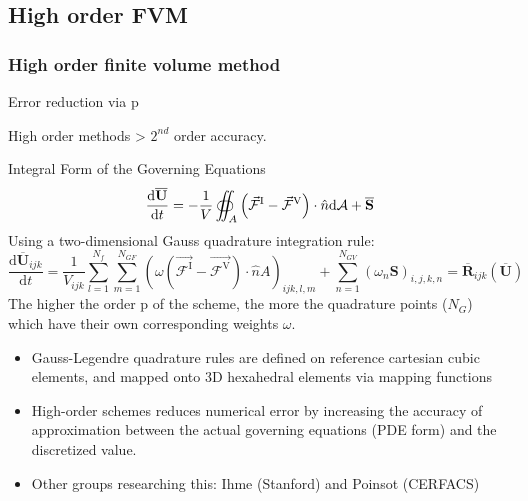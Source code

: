 \documentclass{beamer}
\begin{document}
\subsection{High order FVM}
\begin{frame}%
\frametitle{High order finite volume method}
\begin{minipage}[t][1\textheight]{1\textwidth}
\vspace{-20pt}
\begin{exampleblock}{Error reduction via p}
\tiny

High order methods > $2^{nd}$ order accuracy.

\begin{block}{Integral Form of the Governing Equations}
     \[
      \frac{\mathrm{d}\overline{\mathbf{U}}}{\mathrm{d}t} = 
      - \frac{1}{V} \oiint_A \left( \vec{\mathcal{F}}^{\rm I} - 
      \vec{\mathcal{F}}^{\rm V} \right) \cdot \hat{n} \mathrm{d}\mathcal{A} + 
      \overline{\mathbf{S}}
     \] 
    Using a two-dimensional Gauss quadrature integration rule:
    \[  \frac{\mathrm{d}\overline{\mathbf{U}}_{ijk}}{\mathrm{d}t} = 
       \frac{1}{{V}_{ijk}} \sum_{l=1}^{N_f}     
      \sum_{m=1}^{N_{GF}} \left( \omega \left(\vec{\mathcal{F}^{\mathrm{I}}} - 
      \vec{\mathcal{F}^{\mathrm{V}}} \right)\cdot \hat{n} {A} \right)_{ijk,l,m} 
      + \sum_{n=1}^{N_{GV}} \left( \omega_n {\mathbf{S}} \right)_{i,j,k,n}      
       = \overline{\mathbf{R}}_{ijk}  \left( \overline{\mathbf{U}} \right) \]
    The higher the order p of the scheme, the more the quadrature points ($ N_G $) which have their own corresponding weights $ \omega $.
\end{block}


\begin{itemize}
\tiny
\item Gauss-Legendre quadrature rules are defined on reference cartesian cubic elements, and mapped onto 3D hexahedral elements via mapping functions
\item High-order schemes reduces numerical error by increasing the accuracy of approximation between the actual governing equations (PDE form) and the discretized value.
\item Other groups researching this: Ihme (Stanford) and Poinsot (CERFACS)
\end{itemize}
\end{exampleblock}
\end{minipage}


\end{frame}
\end{document}
